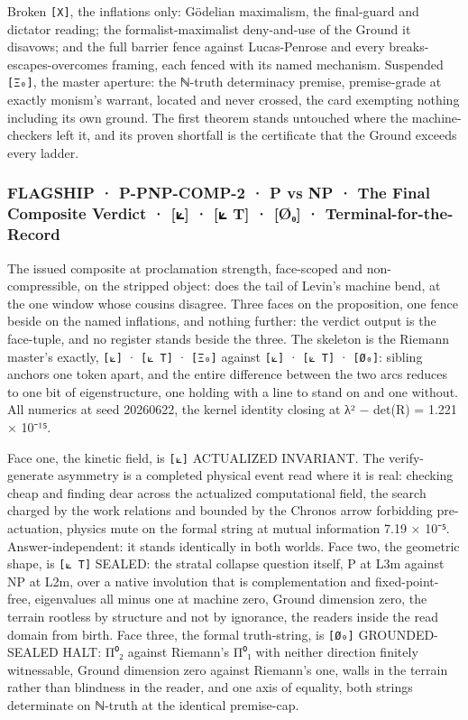 \documentclass[10pt,twocolumn]{article}
\begin{document}
Broken \texttt{{[}X{]}}, the inflations only: Gödelian maximalism, the
final-guard and dictator reading; the formalist-maximalist deny-and-use
of the Ground it disavows; and the full barrier fence against
Lucas-Penrose and every breaks-escapes-overcomes framing, each fenced
with its named mechanism. Suspended \texttt{{[}Ξ₀{]}}, the master
aperture: the ℕ-truth determinacy premise, premise-grade at exactly
monism's warrant, located and never crossed, the card exempting nothing
including its own ground. The first theorem stands untouched where the
machine-checkers left it, and its proven shortfall is the certificate
that the Ground exceeds every ladder.

\hypertarget{flagship-p-pnp-comp-2-p-vs-np-the-final-composite-verdict-t-uxf8ux2080-terminal-for-the-record}{%
\subsubsection{FLAGSHIP · P-PNP-COMP-2 · P vs NP · The Final Composite
Verdict · {[}⟀{]} · {[}⟀ T{]} · {[}Ø₀{]} ·
Terminal-for-the-Record}\label{flagship-p-pnp-comp-2-p-vs-np-the-final-composite-verdict-t-uxf8ux2080-terminal-for-the-record}}

The issued composite at proclamation strength, face-scoped and
non-compressible, on the stripped object: does the tail of Levin's
machine bend, at the one window whose cousins disagree. Three faces on
the proposition, one fence beside on the named inflations, and nothing
further: the verdict output is the face-tuple, and no register stands
beside the three. The skeleton is the Riemann master's exactly,
\texttt{{[}⟀{]}} · \texttt{{[}⟀\ T{]}} · \texttt{{[}Ξ₀{]}} against
\texttt{{[}⟀{]}} · \texttt{{[}⟀\ T{]}} · \texttt{{[}Ø₀{]}}: sibling
anchors one token apart, and the entire difference between the two arcs
reduces to one bit of eigenstructure, one holding with a line to stand
on and one without. All numerics at seed 20260622, the kernel identity
closing at \textbar λ² − det(R)\textbar{} = 1.221 × 10⁻¹⁵.

Face one, the kinetic field, is \texttt{{[}⟀{]}} ACTUALIZED INVARIANT.
The verify-generate asymmetry is a completed physical event read where
it is real: checking cheap and finding dear across the actualized
computational field, the search charged by the work relations and
bounded by the Chronos arrow forbidding pre-actuation, physics mute on
the formal string at mutual information 7.19 × 10⁻⁵. Answer-independent:
it stands identically in both worlds. Face two, the geometric shape, is
\texttt{{[}⟀\ T{]}} SEALED: the stratal collapse question itself, P at
L3m against NP at L2m, over a native involution that is complementation
and fixed-point-free, eigenvalues all minus one at machine zero, Ground
dimension zero, the terrain rootless by structure and not by ignorance,
the readers inside the read domain from birth. Face three, the formal
truth-string, is \texttt{{[}Ø₀{]}} GROUNDED-SEALED HALT: Π⁰₂ against
Riemann's Π⁰₁ with neither direction finitely witnessable, Ground
dimension zero against Riemann's one, walls in the terrain rather than
blindness in the reader, and one axis of equality, both strings
determinate on ℕ-truth at the identical premise-cap.
\end{document}
